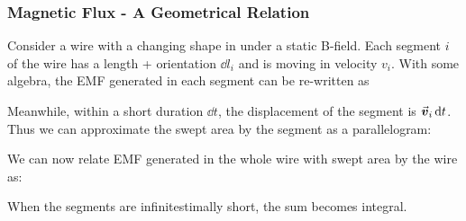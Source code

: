 \documentclass[class=article, crop=false, 12pt]{standalone}
\begin{document}
\subsubsection{Magnetic Flux - A Geometrical Relation}

Consider a wire with a changing shape in under a static B-field. 
Each segment $i$ of the wire has a length + orientation $\dd{l_i}$ and 
is moving in velocity $v_i$.
With some algebra, the EMF generated in each segment can be re-written as 

Meanwhile, within a short duration $\dd{t}$,
the displacement of the segment is $\va*{v}_i\dd{t}$.
Thus we can approximate the swept area by the segment as a parallelogram:


We can now relate EMF generated in the whole wire with swept area by the wire as:

When the segments are infinitestimally short, the sum becomes integral.
\end{document}
